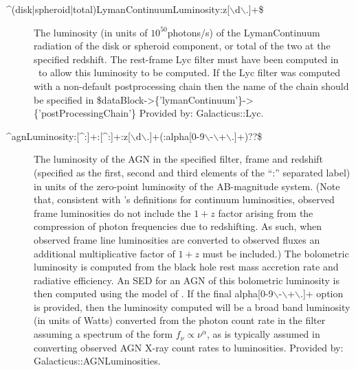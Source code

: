 \begin{description}
 \item[{\normalfont \ttfamily \textasciicircum(disk|spheroid|total)LymanContinuumLuminosity:z[$\backslash$d$\backslash$.]+\$}] The luminosity (in units of $10^{50}$photons/s) of the \gls{LymanContinuum} radiation of the disk or spheroid component, or total of the two at the specified redshift. The rest-frame {\normalfont \ttfamily Lyc} filter must have been computed in \glc\ to allow this luminosity to be computed. If the {\normalfont \ttfamily Lyc} filter was computed with a non-default postprocessing chain then the name of the chain should be specified in {\normalfont \ttfamily \$dataBlock-\textgreater\{'lymanContinuum'\}-\textgreater\{'postProcessingChain'\}} Provided by: {\normalfont \ttfamily Galacticus::Lyc}.
 \item[{\normalfont \ttfamily \textasciicircum agnLuminosity:[\textasciicircum:]+:[\textasciicircum:]+:z[$\backslash$d$\backslash$.]+(:alpha[0-9$\backslash$-$\backslash$+$\backslash$.]+)??\$}] The luminosity of the AGN in the specified filter, frame and redshift (specified as the first, second and third elements of the ``{\normalfont \ttfamily :}'' separated label) in units of the zero-point luminosity of the AB-magnitude system. (Note that, consistent with \glc's definitions for continuum luminosities, observed frame luminosities do not include the $1+z$ factor arising from the compression of photon frequencies due to redshifting. As such, when observed frame line luminosities are converted to observed fluxes an additional multiplicative factor of $1+z$ must be included.) The bolometric luminosity is computed from the black hole rest mass accretion rate and radiative efficiency. An SED for an AGN of this bolometric luminosity is then computed using the model of \cite{hopkins_observational_2007}. If the final {\normalfont \ttfamily alpha[0-9$\backslash$-$\backslash$+$\backslash$.]+} option is provided, then the luminosity computed will be a broad band luminosity (in units of Watts) converted from the photon count rate in the filter assuming a spectrum of the form $f_\nu \propto \nu^\alpha$, as is typically assumed in converting observed AGN X-ray count rates to luminosities. Provided by: {\normalfont \ttfamily Galacticus::AGNLuminosities}.



\end{description}
